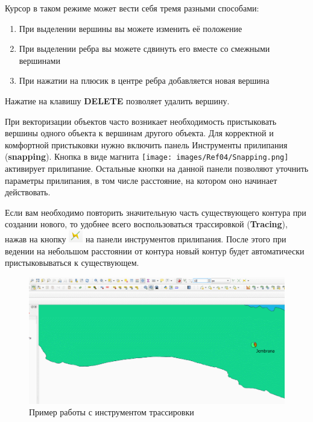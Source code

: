 \documentclass[
  12pt,
]{book}
\begin{document}
Курсор в таком режиме может вести себя тремя разными способами:

\begin{enumerate}
\def\labelenumi{\arabic{enumi})}
\item
  При выделении вершины вы можете изменить её положение
\item
  При выделении ребра вы можете сдвинуть его вместе со смежными вершинами
\item
  При нажатии на плюсик в центре ребра добавляется новая вершина
\end{enumerate}

Нажатие на клавишу \textbf{DELETE} позволяет удалить вершину.

При векторизации объектов часто возникает необходимость пристыковать вершины одного объекта к вершинам другого объекта. Для корректной и комфортной пристыковки нужно включить панель Инструменты прилипания (\textbf{snapping}). Кнопка в виде магнита \texttt{[image: images/Ref04/Snapping.png]} активирует прилипание. Остальные кнопки на данной панели позволяют уточнить параметры прилипания, в том числе расстояние, на котором оно начинает действовать.

Если вам необходимо повторить значительную часть существующего контура при создании нового, то удобнее всего воспользоваться трассировкой (\textbf{Tracing}), нажав на кнопку \includegraphics{images/vector/Tracing.png} на панели инструментов прилипания. После этого при ведении на небольшом расстоянии от контура новый контур будет автоматически пристыковываться к существующем.

\begin{figure}
\centering
\includegraphics{images/vector/Tracing.gif}
\caption{Пример работы с инструментом трассировки}
\end{figure}
\end{document}
